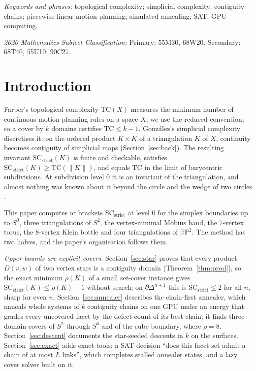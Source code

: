 \documentclass[12pt]{article}
\newcommand{\TC}{\mathrm{TC}}
\newcommand{\SC}{\mathrm{SC}}
\newcommand{\SCst}{\SC_{\mathrm{strict}}}
\begin{document}
\medskip\noindent
\emph{Keywords and phrases:} topological complexity; simplicial
complexity; contiguity chains; piecewise linear motion planning;
simulated annealing; SAT; GPU computing.

\medskip\noindent
\emph{2020 Mathematics Subject Classification:} Primary: 55M30, 68W20.
Secondary: 68T40, 55U10, 90C27.

\section{Introduction}\label{sec:intro}

Farber's topological complexity $\TC(X)$ \cite{F03} measures the minimum
number of continuous motion-planning rules on a space $X$; we use the
reduced convention, so a cover by $k$ domains certifies $\TC\le k-1$.
Gonz\'alez's simplicial complexity \cite{G18} discretises it: on the ordered
product $K\times K$ of a triangulation $K$ of $X$, continuity becomes
contiguity of simplicial maps (Section~\ref{sec:back}).  The resulting
invariant $\SCst(K)$ is finite and checkable, satisfies
$\SCst(K)\ge\TC(\|K\|)$, and equals $\TC$ in the limit of barycentric
subdivisions.  At subdivision level $0$ it is an invariant of the
triangulation, and almost nothing was known about it beyond the circle and
the wedge of two circles \cite{OLGB21}.

This paper computes or brackets $\SCst$ at level $0$ for the simplex
boundaries up to $S^9$, three triangulations of $S^2$, the vertex-minimal
M\"obius band, the $7$-vertex torus, the $8$-vertex Klein bottle and four
triangulations of $\mathbb{RP}^2$.  The method has two halves, and the
paper's organisation follows them.

\emph{Upper bounds are explicit covers.}  Section~\ref{sec:star} proves that
every product $D(v,w)$ of two vertex stars is a contiguity domain
(Theorem~\ref{thm:prod}), so the exact minimum $\rho(K)$ of a small set-cover
instance gives $\SCst(K)\le\rho(K)-1$ without search; on
$\partial\Delta^{n+1}$ this is $\SCst\le2$ for all $n$, sharp for even $n$.
Section~\ref{sec:annealer} describes the chain-first annealer, which anneals
whole systems of $k$ contiguity chains on one GPU under an energy that grades
every uncovered facet by the defect count of its best chain; it finds
three-domain covers of $S^2$ through $S^6$ and of the cube boundary, where
$\rho=8$.  Section~\ref{sec:descent} documents the star-seeded descents in
$k$ on the surfaces.  Section~\ref{sec:exact} adds exact tools: a SAT
decision ``does this facet set admit a chain of at most $L$ links'', which
completes stalled annealer states, and a lazy cover solver built on it.
\end{document}
